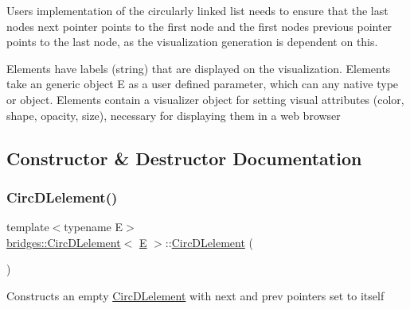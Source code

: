 User\textquotesingle{}s implementation of the circularly linked list needs to ensure that the last node\textquotesingle{}s next pointer points to the first node and the first node\textquotesingle{}s previous pointer points to the last node, as the visualization generation is dependent on this.

Elements have labels (string) that are displayed on the visualization. Elements take an generic object E as a user defined parameter, which can any native type or object. Elements contain a visualizer object for setting visual attributes (color, shape, opacity, size), necessary for displaying them in a web browser 

\subsection{Constructor \& Destructor Documentation}
\mbox{\label{classbridges_1_1_circ_d_lelement_a35279302f5fb5297eeb6efead475921e}} 
\subsubsection{\texorpdfstring{CircDLelement()}{CircDLelement()}\hspace{0.1cm}{\footnotesize\ttfamily [1/4]}}
{\footnotesize\ttfamily template$<$typename E$>$ \\
\mbox{\hyperlink{classbridges_1_1_circ_d_lelement}{bridges\+::\+Circ\+D\+Lelement}}$<$ \mbox{\hyperlink{namespacebridges_acfb0a4f7877d8f63de3e6862004c50eda3a3ea00cfc35332cedf6e5e9a32e94da}{E}} $>$\+::\mbox{\hyperlink{classbridges_1_1_circ_d_lelement}{Circ\+D\+Lelement}} (\begin{DoxyParamCaption}{ }\end{DoxyParamCaption})\hspace{0.3cm}{\ttfamily [inline]}}

Constructs an empty \mbox{\hyperlink{classbridges_1_1_circ_d_lelement}{Circ\+D\+Lelement}} with next and prev pointers set to itself \mbox{\label{classbridges_1_1_circ_d_lelement_a7dc1ad0eca7c06678064789303c522ed}} 
